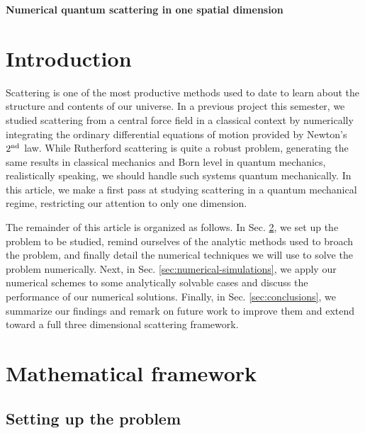 
\def\HWnum{Final Project}
\def\duedate{December 9, 2024}




\begin{center}
    \textbf{\Large Numerical quantum scattering in one spatial dimension}
\end{center}

\section{Introduction}
\label{sec:introduction}

Scattering is one of the most productive methods used to date to learn about the structure and contents of our universe.
In a previous project this semester, we studied scattering from a central force field in a classical context by numerically integrating the ordinary differential equations of motion provided by Newton's $2^{\rm nd}$ law.
While Rutherford scattering is quite a robust problem, generating the same results in classical mechanics and Born level in quantum mechanics, realistically speaking, we should handle such systems quantum mechanically.
In this article, we make a first pass at studying scattering in a quantum mechanical regime, restricting our attention to only one dimension.

The remainder of this article is organized as follows.
In Sec. \ref{sec:mathematical-framework}, we set up the problem to be studied, remind ourselves of the analytic methods used to broach the problem, and finally detail the numerical techniques we will use to solve the problem numerically.
Next, in Sec. \ref{sec:numerical-simulations}, we apply our numerical schemes to some analytically solvable cases and discuss the performance of our numerical solutions.
Finally, in Sec. \ref{sec:conclusions}, we summarize our findings and remark on future work to improve them and extend toward a full three dimensional scattering framework.


\section{Mathematical framework}
\label{sec:mathematical-framework}


\subsection{Setting up the problem}

